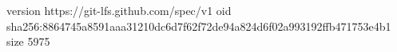 version https://git-lfs.github.com/spec/v1
oid sha256:8864745a8591aaa31210dc6d7f62f72de94a824d6f02a993192ffb471753e4b1
size 5975
